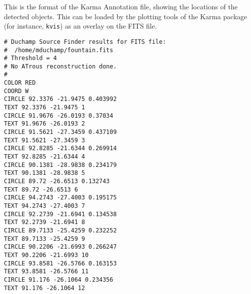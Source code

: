 %
%
%
%
\label{app-karma}

This is the format of the Karma Annotation file, showing the locations
of the detected objects. This can be loaded by the plotting tools of
the Karma package (for instance, \texttt{kvis}) as an overlay on the FITS
file.

\begin{verbatim}
# Duchamp Source Finder results for FITS file:
#  /home/mduchamp/fountain.fits
# Threshold = 4
# No ATrous reconstruction done.
#
COLOR RED
COORD W
CIRCLE 92.3376 -21.9475 0.403992
TEXT 92.3376 -21.9475 1
CIRCLE 91.9676 -26.0193 0.37034
TEXT 91.9676 -26.0193 2
CIRCLE 91.5621 -27.3459 0.437109
TEXT 91.5621 -27.3459 3
CIRCLE 92.8285 -21.6344 0.269914
TEXT 92.8285 -21.6344 4
CIRCLE 90.1381 -28.9838 0.234179
TEXT 90.1381 -28.9838 5
CIRCLE 89.72 -26.6513 0.132743
TEXT 89.72 -26.6513 6
CIRCLE 94.2743 -27.4003 0.195175
TEXT 94.2743 -27.4003 7
CIRCLE 92.2739 -21.6941 0.134538
TEXT 92.2739 -21.6941 8
CIRCLE 89.7133 -25.4259 0.232252
TEXT 89.7133 -25.4259 9
CIRCLE 90.2206 -21.6993 0.266247
TEXT 90.2206 -21.6993 10
CIRCLE 93.8581 -26.5766 0.163153
TEXT 93.8581 -26.5766 11
CIRCLE 91.176 -26.1064 0.234356
TEXT 91.176 -26.1064 12
\end{verbatim}
